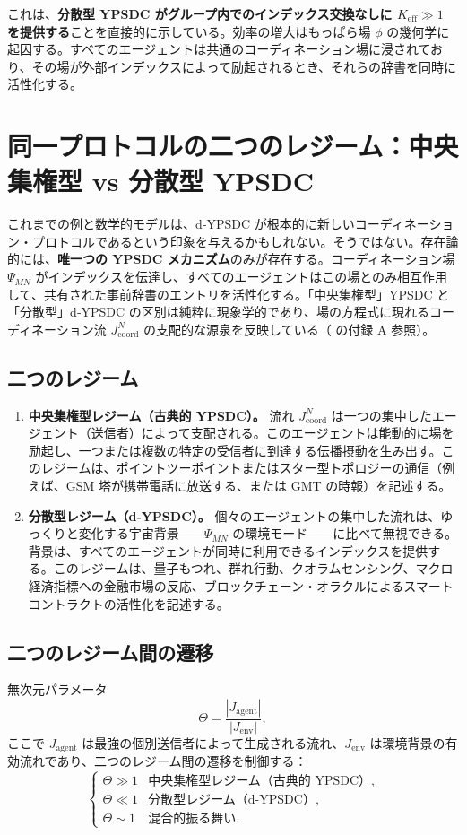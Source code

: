 \documentclass[11pt,a4paper]{article}
\begin{document}
	これは、\textbf{分散型 YPSDC がグループ内でのインデックス交換なしに \(K_{\mathrm{eff}} \gg 1\) を提供する}ことを直接的に示している。効率の増大はもっぱら場 \(\phi\) の幾何学に起因する。すべてのエージェントは共通のコーディネーション場に浸されており、その場が外部インデックスによって励起されるとき、それらの辞書を同時に活性化する。
	
	\section{同一プロトコルの二つのレジーム：中央集権型 vs 分散型 YPSDC}
	\label{sec:two-regimes}
	
	これまでの例と数学的モデルは、d‑YPSDC が根本的に新しいコーディネーション・プロトコルであるという印象を与えるかもしれない。そうではない。存在論的には、\textbf{唯一つの YPSDC メカニズム}のみが存在する。コーディネーション場 \(\Psi_{MN}\) がインデックスを伝達し、すべてのエージェントはこの場とのみ相互作用して、共有された事前辞書のエントリを活性化する。「中央集権型」YPSDC と「分散型」d‑YPSDC の区別は純粋に現象学的であり、場の方程式に現れるコーディネーション流 \(J^{N}_{\mathrm{coord}}\) の支配的な源泉を反映している（\cite{YUCT} の付録 A 参照）。
	
	\subsection{二つのレジーム}
	\begin{enumerate}[leftmargin=*, label=\textbf{(\arabic*)}]
		\item \textbf{中央集権型レジーム（古典的 YPSDC）。} 流れ \(J^{N}_{\mathrm{coord}}\) は一つの集中したエージェント（送信者）によって支配される。このエージェントは能動的に場を励起し、一つまたは複数の特定の受信者に到達する伝播摂動を生み出す。このレジームは、ポイントツーポイントまたはスター型トポロジーの通信（例えば、GSM 塔が携帯電話に放送する、または GMT の時報）を記述する。
		
		\item \textbf{分散型レジーム（d‑YPSDC）。} 個々のエージェントの集中した流れは、ゆっくりと変化する宇宙背景――\(\Psi_{MN}\) の環境モード――に比べて無視できる。背景は、すべてのエージェントが同時に利用できるインデックスを提供する。このレジームは、量子もつれ、群れ行動、クオラムセンシング、マクロ経済指標への金融市場の反応、ブロックチェーン・オラクルによるスマートコントラクトの活性化を記述する。
	\end{enumerate}
	
	\subsection{二つのレジーム間の遷移}
	無次元パラメータ
	\[
	\Theta = \frac{|J_{\mathrm{agent}}|}{|J_{\mathrm{env}}|},
	\]
	ここで \(J_{\mathrm{agent}}\) は最強の個別送信者によって生成される流れ、\(J_{\mathrm{env}}\) は環境背景の有効流れであり、二つのレジーム間の遷移を制御する：
	\[
	\begin{cases}
		\Theta \gg 1 & \text{中央集権型レジーム（古典的 YPSDC）}, \\
		\Theta \ll 1 & \text{分散型レジーム（d‑YPSDC）}, \\
		\Theta \sim 1 & \text{混合的振る舞い}.
	\end{cases}
	\]
	
\end{document}
